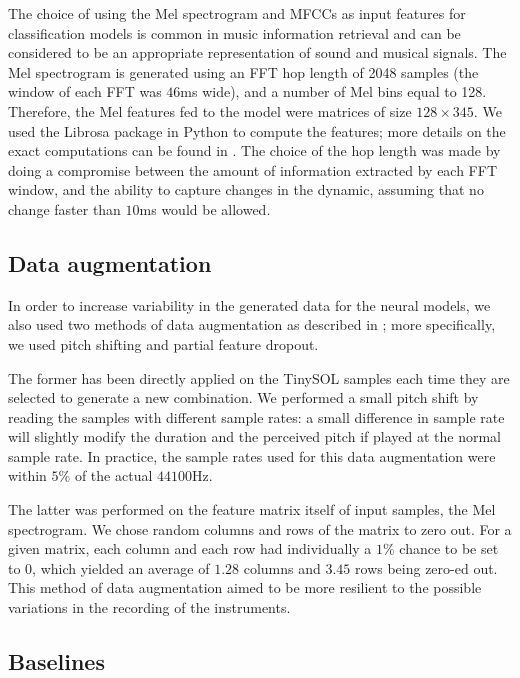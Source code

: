 \documentclass[runningheads,a4paper]{llncs}
\begin{document}
The choice of using the Mel spectrogram and MFCCs as input features for classification models is common in music information retrieval \cite{McKinney2003} and can be considered to be an appropriate representation of sound and musical signals. The Mel spectrogram is generated using an FFT hop length of 2048 samples (the window of each FFT was $46$ms wide), and a number of Mel bins equal to 128. Therefore, the Mel features fed to the model were matrices of size $128\times 345$. We used the Librosa package in Python to compute the features; more details on the exact computations can be found in \cite{mcfee15}. The choice of the hop length was made by doing a compromise between the amount of information extracted by each FFT window, and the ability to capture changes in the dynamic, assuming that no change faster than $10$ms would be allowed.


\subsection{Data augmentation}

In order to increase variability in the generated data for the neural models, we also used two methods of data augmentation as described in \cite{Salamon17, Bhardwaj17}; more specifically, we used pitch shifting and partial feature dropout.

The former has been directly applied on the TinySOL samples each time they are selected to generate a new combination. We performed a small pitch shift by reading the samples with different sample rates: a small difference in sample rate will slightly modify the duration and the perceived pitch if played at the normal sample rate. In practice, the sample rates used for this data augmentation were within $5\%$ of the actual $44100$Hz.

The latter was performed on the feature matrix itself of input samples, the Mel spectrogram. We chose random columns and rows of the matrix to zero out. For a given matrix, each column and each row had individually a $1\%$ chance to be set to 0, which yielded an average of $1.28$  columns and $3.45$ rows being zero-ed out. This method of data augmentation aimed to be more resilient to the possible variations in the recording of the instruments.

\subsection{Baselines}
\label{sec:baseline}
\end{document}
